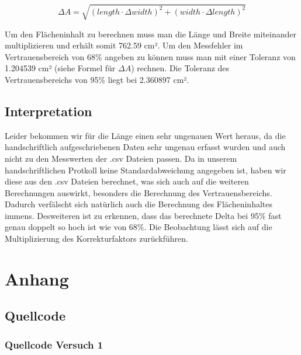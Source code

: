 \documentclass[12pt, oneside, a4paper, \docLanguage]{report}
\begin{document}
\[\Delta A = \sqrt{(length \cdot \Delta width)^2 + (width \cdot \Delta length)^2}\]

Um den Flächeninhalt zu berechnen muss man die Länge und Breite miteinander multiplizieren und erhält somit 762.59 cm². Um den Messfehler im Vertrauensbereich von 68\% angeben zu können muss man mit einer Toleranz von 1.204539 cm² (siehe Formel für $\Delta A$) rechnen. Die Toleranz des Vertrauensbereichs von 95\% liegt bei 2.360897  cm². 

\section{Interpretation}
\label{chap:VERSUCH_3_INTERPRETATION}
Leider bekommen wir für die Länge einen sehr ungenauen Wert heraus, da die handschriftlich aufgeschriebenen Daten sehr ungenau erfasst wurden und auch nicht zu den Messwerten der .csv Dateien passen. Da in unserem handschriftlichen Protkoll keine Standardabweichung angegeben ist, haben wir diese aus den .csv Dateien berechnet, was sich auch auf die weiteren Berechnungen auswirkt, besonders die Berechnung des Vertrauensbereichs. Dadurch verfälscht sich natürlich auch die Berechnung des Flächeninhaltes immens. Desweiteren ist zu erkennen, dass das berechnete Delta bei 95\% fast genau doppelt so hoch ist wie von 68\%. Die Beobachtung lässt sich auf die Multiplizierung des Korrekturfaktors zurückführen.


%
%
\renewcommand\thesection{A.\arabic{section}}
\renewcommand\thesubsection{\thesection.\arabic{subsection}}

\chapter*{Anhang}
\label{chap:APPENDIX}
\addtocounter{chapter}{1}
\setcounter{section}{0}

\section{Quellcode}
\label{chap:APPENDIX_SOURCECODE}

\subsection{Quellcode Versuch 1}
\label{chap:APPENDIX_SOURCECODE_V1}

\newpage
\end{document}
